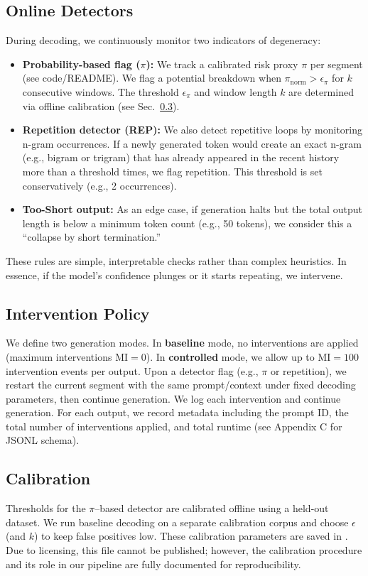 \documentclass{article}
\begin{document}
\subsection{Online Detectors}
During decoding, we continuously monitor two indicators of degeneracy:
\begin{itemize}
  \item \textbf{Probability-based flag ($\pi$):} We track a calibrated risk proxy $\pi$ per segment (see code/README). We flag a potential breakdown when $\pi_{\text{norm}} > \epsilon_{\pi}$ for $k$ consecutive windows. The threshold $\epsilon_{\pi}$ and window length $k$ are determined via offline calibration (see Sec.~\ref{sec:calibration}).
  \item \textbf{Repetition detector (REP):} We also detect repetitive loops by monitoring n-gram occurrences. If a newly generated token would create an exact n-gram (e.g., bigram or trigram) that has already appeared in the recent history more than a threshold times, we flag repetition. This threshold is set conservatively (e.g., 2 occurrences).
  \item \textbf{Too-Short output:} As an edge case, if generation halts but the total output length is below a minimum token count (e.g., 50 tokens), we consider this a ``collapse by short termination.''
\end{itemize}
These rules are simple, interpretable checks rather than complex heuristics. In essence, if the model's confidence plunges or it starts repeating, we intervene.

\subsection{Intervention Policy}
We define two generation modes. In \textbf{baseline} mode, no interventions are applied (maximum interventions $\text{MI}=0$). In \textbf{controlled} mode, we allow up to $\text{MI}=100$ intervention events per output. Upon a detector flag (e.g., $\pi$ or repetition), we restart the current segment with the same prompt/context under fixed decoding parameters, then continue generation. We log each intervention and continue generation. For each output, we record metadata including the prompt ID, the total number of interventions applied, and total runtime (see Appendix C for JSONL schema).

\subsection{Calibration}
\label{sec:calibration}
Thresholds for the $\pi$--based detector are calibrated offline using a held-out dataset. We run baseline decoding on a separate calibration corpus and choose $\epsilon$ (and $k$) to keep false positives low. These calibration parameters are saved in . Due to licensing, this file cannot be published; however, the calibration procedure and its role in our pipeline are fully documented for reproducibility.
\end{document}
